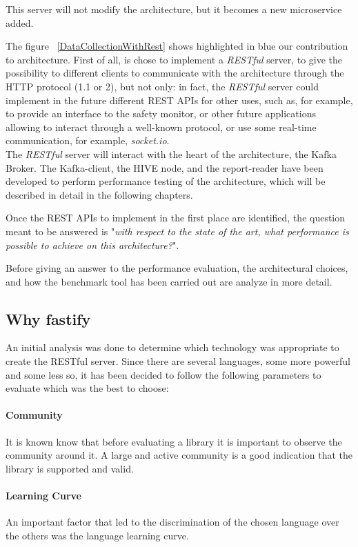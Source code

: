 \documentclass[]{IEEEtran}
\begin{document}
This server will not modify the architecture, but it becomes a new microservice added.

The figure ~\ref{DataCollectionWithRest} shows highlighted in blue our contribution to architecture. First of all, is chose to implement a \textit{RESTful} server, to give the possibility to different clients to communicate with the architecture through the HTTP protocol (1.1 or 2), but not only: in fact, the \textit{RESTful} server could implement in the future different REST APIs for other uses, such as, for example, to provide an interface to the safety monitor, or other future applications allowing to interact through a well-known protocol, or use some real-time communication, for example, \textit{socket.io}.
\\

The \textit{RESTful} server will interact with the heart of the architecture, the Kafka Broker.
The Kafka-client, the HIVE node, and the report-reader have been developed to perform performance testing of the architecture, which will be described in detail in the following chapters.

Once the REST APIs to implement in the first place are identified, the question meant to be answered is "\textit{with respect to the state of the art, what performance is possible to achieve on this architecture?}".

Before giving an answer to the performance evaluation, the architectural choices, and how the benchmark tool has been carried out are analyze in more detail.

\subsection{Why fastify}
An initial analysis was done to determine which technology was appropriate to create the RESTful server.
Since there are several languages, some more powerful and some less so, it has been decided to follow the following parameters to evaluate which was the best to choose:
\paragraph{Community}
It is known know that before evaluating a library it is important to observe the community around it. A large and active community is a good indication that the library is supported and valid.
\paragraph{Learning Curve}
An important factor that led to the discrimination of the chosen language over the others was the language learning curve.
\end{document}
